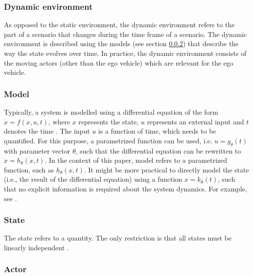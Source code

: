 \subsubsection{Dynamic environment}
\label{sec:dynamic environment}
As opposed to the static environment, the dynamic environment refers to the part of a scenario that changes during the time frame of a scenario. The dynamic environment is described using the models (see section \ref{sec:model}) that describe the way the state evolves over time. In practice, the dynamic environment consists of the moving actors (other than the ego vehicle) which are relevant for the ego vehicle.

\subsubsection{Model}
\label{sec:model}
Typically, a system is modelled using a differential equation of the form $\dot{x}=f(x,u,t)$, where $x$ represents the state, $u$ represents an external input and $t$ denotes the time \cite{norman2011control}. The input $u$ is a function of time, which needs to be quantified. For this purpose, a parametrized function can be used, i.e. $u=g_{\theta}(t)$ with parameter vector $\theta$, such that the differential equation can be rewritten to $\dot{x}=h_{\theta}(x,t)$. In the context of this paper, model refers to a parametrized function, such as $h_{\theta}(x,t)$. It might be more practical to directly model the state (i.e., the result of the differential equation) using a function $x=k_{\theta}(t)$, such that no explicit information is required about the system dynamics. For example, see \cite{deGelder2017assessment}.

\subsubsection{State}
\label{sec:state}
The state refers to a quantity. The only restriction is that all states must be linearly independent \cite{norman2011control}.

\subsubsection{Actor}
\label{sec:actor}
